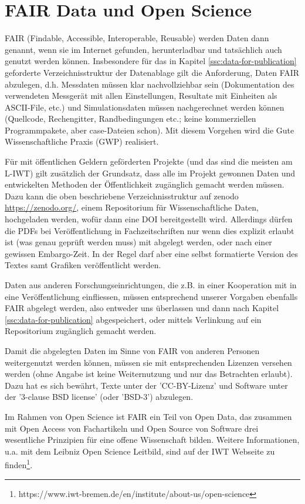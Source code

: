 \section{FAIR Data und Open Science}\label{ssc:FAIR-Data}

FAIR (Findable, Accessible, Interoperable, Reusable) werden Daten dann genannt, wenn sie im Internet gefunden, herunterladbar und tatsächlich auch genutzt werden können. Insbesondere für das in Kapitel \ref{ssc:data-for-publication} geforderte Verzeichnisstruktur der Datenablage gilt die Anforderung, Daten FAIR abzulegen, d.h. Messdaten müssen klar nachvollziehbar sein (Dokumentation des verwendeten Messgerät mit allen Einstellungen, Resultate mit Einheiten als ASCII-File, etc.) und Simulationsdaten müssen nachgerechnet werden können (Quellcode, Rechengitter, Randbedingungen etc.; keine kommerziellen Programmpakete, aber case-Dateien schon). Mit diesem Vorgehen wird die Gute Wissenschaftliche Praxis (GWP) realisiert.

Für mit öffentlichen Geldern geförderten Projekte (und das sind die meisten am L-IWT) gilt zusätzlich der Grundsatz, dass alle im Projekt gewonnen Daten und entwickelten Methoden der Öffentlichkeit zugänglich gemacht werden müssen. Dazu kann die oben beschriebene Verzeichnisstruktur auf zenodo \url{https://zenodo.org/}, einem Repositorium für Wissenschaftliche Daten, hochgeladen werden, wofür dann eine DOI bereitgestellt wird. Allerdings dürfen die PDFs bei Veröffentlichung in Fachzeitschriften nur wenn dies explizit erlaubt ist (was genau geprüft werden muss) mit abgelegt werden, oder nach einer gewissen Embargo-Zeit. In der Regel darf aber eine selbst formatierte Version des Textes samt Grafiken veröffentlicht werden.

Daten aus anderen Forschungseinrichtungen, die z.B. in einer Kooperation mit in eine Veröffentlichung einfliessen, müssen entsprechend unserer Vorgaben ebenfalls FAIR abgelegt werden, also entweder uns überlassen und dann nach Kapitel \ref{ssc:data-for-publication} abgespeichert, oder mittels Verlinkung auf ein Repositorium zugänglich gemacht werden.

Damit die abgelegten Daten im Sinne von FAIR von anderen Personen weitergenutzt werden können, müssen sie mit entsprechenden Lizenzen versehen werden (ohne Angabe ist keine Weiternutzung und nur das Betrachten erlaubt).
Dazu hat es sich bewährt, Texte unter der 'CC-BY-Lizenz' und Software unter der '3-clause BSD license' (oder 'BSD-3') abzulegen.

Im Rahmen von Open Science ist FAIR ein Teil von Open Data, das zusammen mit Open Access von Fachartikeln und Open Source von Software drei wesentliche Prinzipien für eine offene Wissenschaft bilden. Weitere Informationen, u.a. mit dem Leibniz Open Science Leitbild, sind auf der IWT Webseite zu finden\footnote{https://www.iwt-bremen.de/en/institute/about-us/open-science}.
